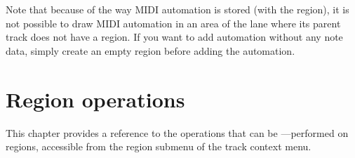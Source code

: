 \documentclass[10pt,a4paper]{book}
\begin{document}
{Note that because of the way MIDI automation is stored (with the
region), it is not possible to draw MIDI automation in an area of the
lane where its parent track does not have a region.  If you want to
add automation without any note data, simply create an empty region
before adding the automation.




\chapter{Region operations}
\label{ch:region-operations}

This chapter provides a reference to the operations that can be
---performed on regions, accessible from the region submenu of the track
context menu.

}
\end{document}
